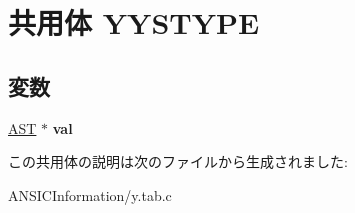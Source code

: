 \hypertarget{unionYYSTYPE}{
\section{共用体 YYSTYPE}
\label{unionYYSTYPE}
}
\subsection*{変数}
\begin{DoxyCompactItemize}
\item 
\hypertarget{unionYYSTYPE_a06d1801b468049b4d4126b43014d5202}{
\hyperlink{structabstract__syntax__tree}{AST} $\ast$ {\bfseries val}}
\label{unionYYSTYPE_a06d1801b468049b4d4126b43014d5202}

\end{DoxyCompactItemize}


この共用体の説明は次のファイルから生成されました:\begin{DoxyCompactItemize}
\item 
ANSICInformation/y.tab.c\end{DoxyCompactItemize}
